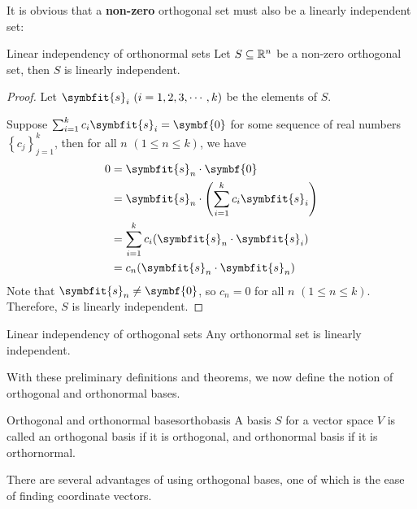 \documentclass[math]{amznotes}
\theoremstyle{remark}
\begin{document}
It is obvious that a {\color{red} \textbf{non-zero}} orthogonal set must also be a linearly independent set:
\begin{thmbox}{Linear independency of orthonormal sets}{}
    Let $S \subseteq \mathbb{R}^n$ be a non-zero orthogonal set, then $S$ is linearly independent.
    \tcblower
    \begin{proof}
        Let $\symbfit{s}_i \,\, (i = 1, 2, 3, \cdots, k)$ be the elements of $S$.

        Suppose $\sum_{i = 1}^{k} c_i \symbfit{s}_i = \symbf{0}$ for some sequence of real numbers $\left\{c_j\right\}_{j = 1}^k$, then for all $n\,\, (1 \leq n \leq k)$, we have
        \begin{align*}
            0 & = \symbfit{s}_n \cdot \symbf{0}                                       \\
              & = \symbfit{s}_n \cdot \left(\sum_{i = 1}^{k} c_i \symbfit{s}_i\right) \\
              & = \sum_{i = 1}^{k} c_i (\symbfit{s}_n \cdot \symbfit{s}_i)            \\
              & = c_n (\symbfit{s}_n \cdot \symbfit{s}_n)
        \end{align*}
        Note that $\symbfit{s}_n \neq \symbf{0}$, so $c_n = 0$ for all $n\,\, (1 \leq n \leq k)$. Therefore, $S$ is linearly independent.
    \end{proof}
\end{thmbox}
\begin{corbox}{Linear independency of orthogonal sets}{}
    Any orthonormal set is linearly independent.
\end{corbox}
With these preliminary definitions and theorems, we now define the notion of orthogonal and orthonormal bases.
\begin{dfnbox}{Orthogonal and orthonormal bases}{orthobasis}
    A basis $S$ for a vector space $V$ is called an orthogonal basis if it is orthogonal, and orthonormal basis if it is orthornormal.
\end{dfnbox}
There are several advantages of using orthogonal bases, one of which is the ease of finding coordinate vectors.
\end{document}
